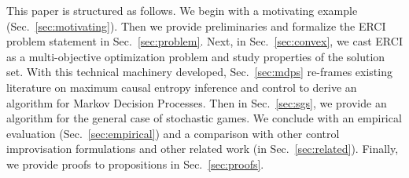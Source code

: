  This paper is structured as follows. We begin
with a motivating example (Sec.~\ref{sec:motivating}). Then we
provide preliminaries and formalize the ERCI problem statement in
Sec.~\ref{sec:problem}. Next, in Sec.~\ref{sec:convex}, we cast ERCI
as a multi-objective optimization problem and study properties of the
solution set. With this technical machinery developed,
Sec.~\ref{sec:mdps} re-frames existing literature on maximum causal
entropy inference and control to derive an algorithm for Markov
Decision Processes.  Then in Sec.~\ref{sec:sgs}, we provide an
algorithm for the general case of stochastic games. We
conclude with an empirical evaluation (Sec.~\ref{sec:empirical}) and a
comparison with other control improvisation formulations and other
related work (in Sec.~\ref{sec:related}). Finally, we provide
proofs to propositions in Sec.~\ref{sec:proofs}.



